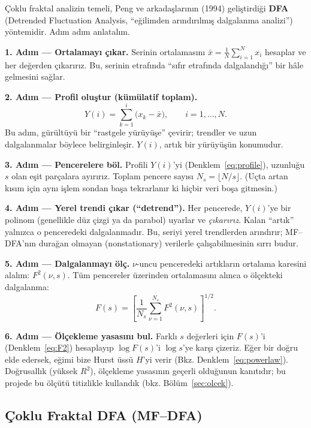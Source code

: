 \documentclass[11pt,a4paper]{article}
\begin{document}
Çoklu fraktal analizin temeli, Peng ve arkadaşlarının (1994) geliştirdiği
\textbf{DFA} (Detrended Fluctuation Analysis, ``eğilimden arındırılmış
dalgalanma analizi'') yöntemidir. Adım adım anlatalım.

\textbf{1. Adım --- Ortalamayı çıkar.}
Serinin ortalamasını $\bar{x} = \frac{1}{N}\sum_{i=1}^{N} x_i$ hesaplar ve her
değerden çıkarırız. Bu, serinin etrafında ``sıfır etrafında dalgalandığı''
bir hâle gelmesini sağlar.

\textbf{2. Adım --- Profil oluştur (kümülatif toplam).}
\begin{equation}
  Y(i) = \sum_{k=1}^{i}\bigl(x_k - \bar{x}\bigr), \qquad i=1,\dots,N.
  \label{eq:profile}
\end{equation}
Bu adım, gürültüyü bir ``rastgele yürüyüşe'' çevirir; trendler ve uzun
dalgalanmalar böylece belirginleşir. $Y(i)$, artık bir yürüyüşün konumudur.

\textbf{3. Adım --- Pencerelere böl.}
Profili $Y(i)$'yi (Denklem~\eqref{eq:profile}), uzunluğu $s$ olan eşit parçalara
ayırırız. Toplam pencere sayısı $N_s = \lfloor N/s \rfloor$. (Uçta artan kısım
için aynı işlem sondan başa tekrarlanır ki hiçbir veri boşa gitmesin.)

\textbf{4. Adım --- Yerel trendi çıkar (``detrend'').}
Her pencerede, $Y(i)$'ye bir polinom (genellikle düz çizgi ya da parabol)
uyarlar ve \emph{çıkarırız}. Kalan ``artık'' yalnızca o penceredeki dalgalanmadır.
Bu, seriyi yerel trendlerden arındırır; MF--DFA'nın durağan olmayan
(nonstationary) verilerle çalışabilmesinin sırrı budur.

\textbf{5. Adım --- Dalgalanmayı ölç.}
$\nu$-uncu penceredeki artıkların ortalama karesini alalım: $F^2(\nu,s)$.
Tüm pencereler üzerinden ortalamasını alınca o ölçekteki dalgalanma:
\begin{equation}
  F(s) = \left[\frac{1}{N_s}\sum_{\nu=1}^{N_s} F^2(\nu,s)\right]^{1/2}.
  \label{eq:F2}
\end{equation}

\textbf{6. Adım --- Ölçekleme yasasını bul.}
Farklı $s$ değerleri için $F(s)$'i (Denklem~\eqref{eq:F2}) hesaplayıp
$\log F(s)$'i $\log s$'ye karşı çizeriz. Eğer bir doğru elde edersek, eğimi
bize Hurst üssü $H$'yi verir (Bkz. Denklem~\eqref{eq:powerlaw}). Doğrusallık
(yüksek $R^2$), ölçekleme yasasının geçerli olduğunun kanıtıdır; bu projede
bu ölçütü titizlikle kullandık (bkz. Bölüm~\ref{sec:olcek}).

\subsection{Çoklu Fraktal DFA (MF--DFA)}
\end{document}
